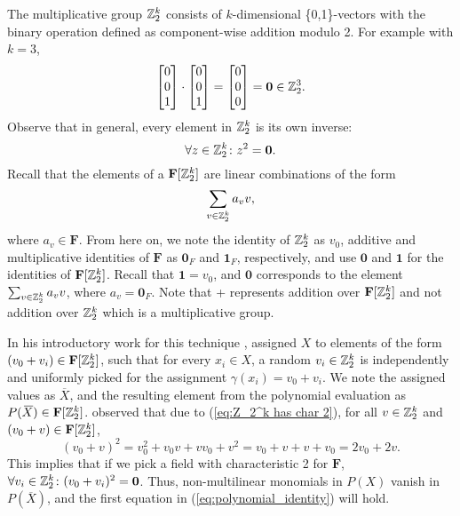 The multiplicative group $\mathbb Z_2^k$ consists of $k$-dimensional \{0,1\}-vectors 
with the binary operation defined as component-wise addition modulo 2. 
For example with $k = 3$, 
\[
  \begin{bmatrix} 0 \\ 0 \\ 1 \end{bmatrix} \cdot 
  \begin{bmatrix} 0 \\ 0 \\ 1 \end{bmatrix} =
  \begin{bmatrix} 0 \\ 0 \\ 0 \end{bmatrix} = \mathbf{0} \in \mathbb Z_2^3.
\]
Observe that in general, every element in $\mathbb Z_2^k$ is its own inverse:
\begin{equation}
  \label{eq:Z_2^k has char 2}
  \forall z \in \mathbb Z_2^k \colon z^2 = \mathbf{0}.
\end{equation}
Recall that the elements of a
$\mathbf{F}[\mathbb Z_2^k]$ are linear combinations of the form 
\[
  \displaystyle \sum_{v \in \mathbb Z_2^k}a_v v,
\]
where $a_v \in \mathbf{F}$. From here on, we note the identity of $\mathbb Z_2^k$ as $v_0$, additive and 
multiplicative identities of $\mathbf{F}$ as $\mathbf{0}_F$ and $\mathbf{1}_F$, respectively, and 
use $\mathbf{0}$ and $\mathbf{1}$ for the identities of 
$\mathbf{F}[\mathbb Z_2^k]$. Recall that $\mathbf{1} = v_0$, and
$\mathbf{0}$ corresponds to the element $\sum_{v \in \mathbb Z_2^k}a_v v$, where $a_v =
\mathbf{0}_F$. Note that + represents addition over $\mathbf{F}[\mathbb Z_2^k]$ and not 
addition over $\mathbb Z_2^k$ which is a multiplicative group.

In his introductory work for this technique \cite{Koutis08}, 
\citeauthor{Koutis08} assigned $X$ 
to elements of the form $(v_0 + v_i) \in \mathbf{F}[\mathbb Z_2^k]$, 
such that for every $x_i \in X$, a random $v_i \in \mathbb Z_2^k$ is independently and uniformly 
picked for the assignment 
$\gamma(x_i) = v_0 + v_i$. %
We note the assigned values as $\overbar{X}$, and the resulting element  
from the polynomial evaluation 
as $P(\,\overline{\!{X}}) \in \mathbf{F}[\mathbb Z_2^k]$. 
\citeauthor{Koutis08} observed that 
due to (\ref{eq:Z_2^k has char 2}), for all $v \in \mathbb Z_2^k$ and $(v_0 + v) \in \mathbf{F}[\mathbb Z_2^k]$, 
\[
  (v_0 + v)^2 = v_0^2 + v_0v + vv_0 + v^2 = v_0 + v + v + v_0 = 2v_0 + 2v.
\]
This implies that if we pick a field with characteristic 2 for $\mathbf{F}$, 
$\forall v_i \in \mathbb Z_2^k \colon (v_0 + v_i)^2 = \mathbf{0}$. Thus, 
non-multilinear monomials in $P(X)$ vanish in $P(\overbar{X})$, and the 
first equation in (\ref{eq:polynomial_identity}) 
will hold.

